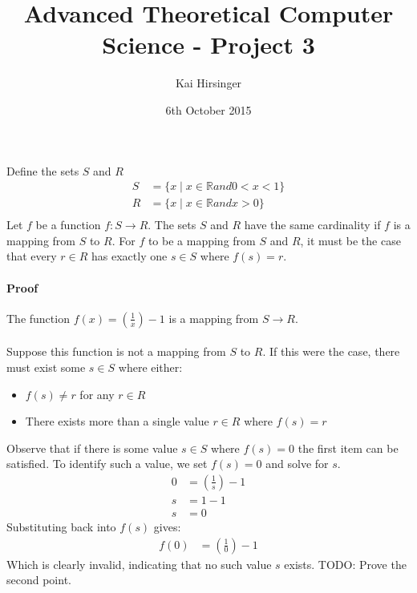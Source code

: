 \documentclass{article}
\title{Advanced Theoretical Computer Science - Project 3}
\date{6th October 2015}
\author{Kai Hirsinger}
\begin{document}
  \maketitle
  
  \newpage
  
  \section{}
    
    \paragraph{}
      Define the sets $S$ and $R$\\
      \begin{align*}
        S &= \{ x \mid x \in \mathbb{R} and 0 < x < 1 \}\\
        R &= \{ x \mid x \in \mathbb{R} and x > 0 \}\\  
      \end{align*}
      Let $f$ be a function  $f: S \to R$. The sets $S$ and $R$ have
      the same cardinality if $f$ is a mapping from $S$ to $R$. For $f$ 
      to be a mapping from $S$ and $R$, it must be the case that 
      every $r \in R$ has exactly one $s \in S$ where $f(s) = r$.\\
    
    \paragraph{Proof}
    The function $f(x) = \left(\frac{1}{x}\right) - 1$ is a mapping from
    $S \to R$. 
	
	\paragraph{}    
    Suppose this function is not a mapping from $S$ to $R$. If this
    were the case, there must exist some $s \in S$ where either:
    \begin{itemize}
      \item $f(s) \neq r$ for any $r \in R$
      \item There exists more than a single value $r \in R$ where $f(s) = r$
    \end{itemize}
    Observe that if there is some value $s \in S$ where $f(s) = 0$ the first
    item can be satisfied. To identify such a value, we set $f(s) = 0$ and 
    solve for $s$.
    \begin{align*}
      0 &= \left(\frac{1}{s}\right) - 1\\
      s &= 1 - 1\\
      s &= 0
    \end{align*}
    Substituting back into $f(s)$ gives:
    \begin{align*}
      f(0) &= \left(\frac{1}{0}\right) - 1
    \end{align*}
    Which is clearly invalid, indicating that no such value $s$ exists.
    TODO: Prove the second point.  
\end{document}
